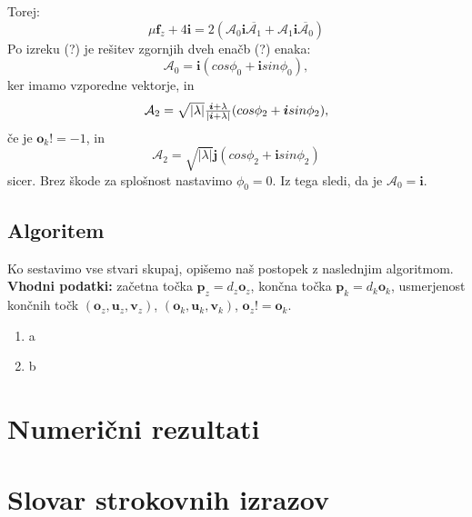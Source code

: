 \documentclass[mat1]{fmfdelo}
\newcommand{\ii}{\boldsymbol i}
\newcommand{\jj}{\boldsymbol j}
\newcommand{\pp}{\boldsymbol p}
\newcommand{\oo}{\boldsymbol o}
\newcommand{\uu}{\boldsymbol u}
\newcommand{\vv}{\boldsymbol v}
\newcommand{\A}{\mathcal A}
\newcommand{\ff}{\boldsymbol f}
\begin{document}
Torej:
\begin{equation}
	\mu \ff_z + 4 \ii = 2(\A_0 \ii \overline{\A_1} + \A_1 \ii \overline{\A_0})
\end{equation}
Po izreku (?) je rešitev zgornjih dveh enačb (?) enaka:
\begin{equation}
	\A_0 = \ii (cos\phi_0 + \ii sin \phi_0),
\end{equation}
ker imamo vzporedne vektorje, in
\begin{equation}
\begin{array}{c c}
	\A_2 = \sqrt{|\lambda|} \frac{\ii + \lambda}{|\ii + \lambda|}(cos\phi_2 + \ii sin\phi_2),
\end{array}
\end{equation}
če je $\oo_k != -1$, in 
\begin{equation}
\A_2 = \sqrt{|\lambda|} \jj(cos\phi_2 + \ii sin\phi_2)
\end{equation}
sicer. Brez škode za splošnost nastavimo $\phi_0 = 0$. Iz tega sledi, da je $\A_0 = \ii$.

\subsection{Algoritem}
Ko sestavimo vse stvari skupaj, opišemo naš postopek z naslednjim algoritmom.\\
\textbf{Vhodni podatki:} začetna točka $\pp_z = d_z \oo_z$, končna točka $\pp_k = d_k \oo_k$, usmerjenost končnih točk $\left( \oo_z, \uu_z, \vv_z\right)$,  $\left( \oo_k, \uu_k, \vv_k\right)$, $\oo_z != \oo_k$.
\begin{enumerate}
	\item a
	\item b
\end{enumerate}

\section{Numerični rezultati}


\section*{Slovar strokovnih izrazov}

\geslo{}{}
\geslo{}{}

\begin{thebibliography}{99}


\end{thebibliography}
\end{document}
